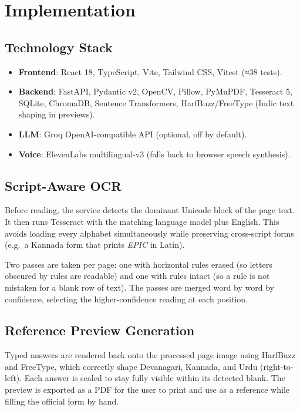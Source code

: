 \documentclass[conference]{IEEEtran}
\begin{document}
\section{Implementation}
\label{sec:implementation}

\subsection{Technology Stack}

\begin{itemize}
  \item \textbf{Frontend}: React 18, TypeScript, Vite, Tailwind CSS, Vitest (≈38 tests).
  \item \textbf{Backend}: FastAPI, Pydantic v2, OpenCV, Pillow, PyMuPDF, Tesseract 5, SQLite, ChromaDB, Sentence Transformers, HarfBuzz/FreeType (Indic text shaping in previews).
  \item \textbf{LLM}: Groq OpenAI-compatible API (optional, off by default).
  \item \textbf{Voice}: ElevenLabs multilingual-v3 (falls back to browser speech synthesis).
\end{itemize}

\subsection{Script-Aware OCR}

Before reading, the service detects the dominant Unicode block of the page text. It then runs Tesseract with the matching language model plus English. This avoids loading every alphabet simultaneously while preserving cross-script forms (e.g.\ a Kannada form that prints \textit{EPIC} in Latin).

Two passes are taken per page: one with horizontal rules erased (so letters obscured by rules are readable) and one with rules intact (so a rule is not mistaken for a blank row of text). The passes are merged word by word by confidence, selecting the higher-confidence reading at each position.

\subsection{Reference Preview Generation}

Typed answers are rendered back onto the processed page image using HarfBuzz and FreeType, which correctly shape Devanagari, Kannada, and Urdu (right-to-left). Each answer is scaled to stay fully visible within its detected blank. The preview is exported as a PDF for the user to print and use as a reference while filling the official form by hand.
\end{document}
